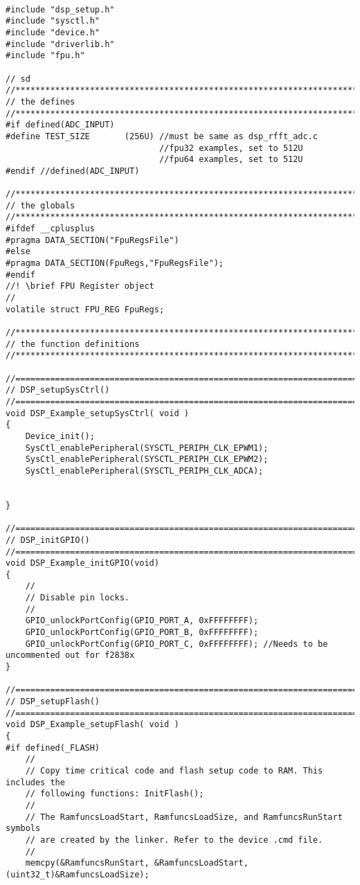 \begin{lstlisting}[caption=\raggedright{mcu-libs/RLS.h}, frame=single]

#include "dsp_setup.h"
#include "sysctl.h"
#include "device.h"
#include "driverlib.h"
#include "fpu.h"

// sd
//*****************************************************************************
// the defines
//*****************************************************************************
#if defined(ADC_INPUT)
#define TEST_SIZE       (256U) //must be same as dsp_rfft_adc.c
							   //fpu32 examples, set to 512U
                               //fpu64 examples, set to 512U
#endif //defined(ADC_INPUT)

//*****************************************************************************
// the globals
//*****************************************************************************
#ifdef __cplusplus
#pragma DATA_SECTION("FpuRegsFile")
#else
#pragma DATA_SECTION(FpuRegs,"FpuRegsFile");
#endif
//! \brief FPU Register object
//
volatile struct FPU_REG FpuRegs;

//*****************************************************************************
// the function definitions
//*****************************************************************************

//=============================================================================
// DSP_setupSysCtrl()
//=============================================================================
void DSP_Example_setupSysCtrl( void )
{
    Device_init();
    SysCtl_enablePeripheral(SYSCTL_PERIPH_CLK_EPWM1);
    SysCtl_enablePeripheral(SYSCTL_PERIPH_CLK_EPWM2);
    SysCtl_enablePeripheral(SYSCTL_PERIPH_CLK_ADCA);


}

//=============================================================================
// DSP_initGPIO()
//=============================================================================
void DSP_Example_initGPIO(void)
{
    //
    // Disable pin locks.
    //
    GPIO_unlockPortConfig(GPIO_PORT_A, 0xFFFFFFFF);
    GPIO_unlockPortConfig(GPIO_PORT_B, 0xFFFFFFFF);
    GPIO_unlockPortConfig(GPIO_PORT_C, 0xFFFFFFFF); //Needs to be uncommented out for f2838x
}

//=============================================================================
// DSP_setupFlash()
//=============================================================================
void DSP_Example_setupFlash( void )
{
#if defined(_FLASH)
    //
    // Copy time critical code and flash setup code to RAM. This includes the
    // following functions: InitFlash();
    //
    // The RamfuncsLoadStart, RamfuncsLoadSize, and RamfuncsRunStart symbols
    // are created by the linker. Refer to the device .cmd file.
    //
    memcpy(&RamfuncsRunStart, &RamfuncsLoadStart, (uint32_t)&RamfuncsLoadSize);


\end{lstlisting}
